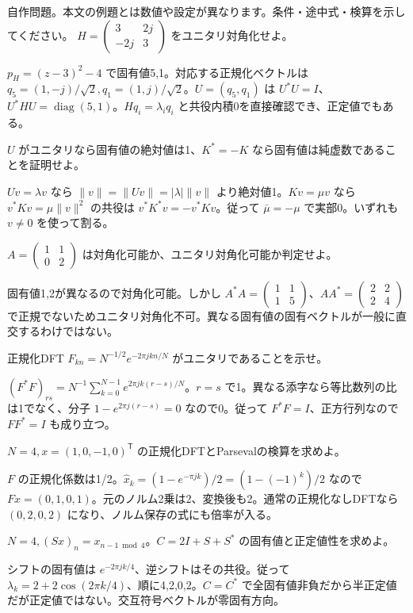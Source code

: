 \documentclass[11pt]{article}
\begin{document}
自作問題。本文の例題とは数値や設定が異なります。条件・途中式・検算を示してください。
\problem[Hermite対角化]
$H=\begin{pmatrix}3&2j\\-2j&3\end{pmatrix}$ をユニタリ対角化せよ。
\begin{ans}
$p_H=(z-3)^2-4$ で固有値5,1。対応する正規化ベクトルは $q_5=(1,-j)/\sqrt2,q_1=(1,j)/\sqrt2$。$U=(q_5,q_1)$ は $U^*U=I$、$U^*HU=\operatorname{diag}(5,1)$。$Hq_i=\lambda_iq_i$ と共役内積0を直接確認でき、正定値でもある。
\end{ans}
\problem[ユニタリの固有値]
$U$ がユニタリなら固有値の絶対値は1、$K^*=-K$ なら固有値は純虚数であることを証明せよ。
\begin{ans}
$Uv=\lambda v$ なら $\|v\|=\|Uv\|=|\lambda|\|v\|$ より絶対値1。$Kv=\mu v$ なら $v^*Kv=\mu\|v\|^2$ の共役は $v^*K^*v=-v^*Kv$。従って $\bar\mu=-\mu$ で実部0。いずれも $v\ne0$ を使って割る。
\end{ans}
\newpage
\problem[正規性]
$A=\begin{pmatrix}1&1\\0&2\end{pmatrix}$ は対角化可能か、ユニタリ対角化可能か判定せよ。
\begin{ans}
固有値1,2が異なるので対角化可能。しかし $A^*A=\begin{pmatrix}1&1\\1&5\end{pmatrix}$、$AA^*=\begin{pmatrix}2&2\\2&4\end{pmatrix}$ で正規でないためユニタリ対角化不可。異なる固有値の固有ベクトルが一般に直交するわけではない。
\end{ans}
\problem[DFTの直交性]
正規化DFT $F_{kn}=N^{-1/2}e^{-2\pi jkn/N}$ がユニタリであることを示せ。
\begin{ans}
$(F^*F)_{rs}=N^{-1}\sum_{k=0}^{N-1}e^{2\pi jk(r-s)/N}$。$r=s$ で1。異なる添字なら等比数列の比は1でなく、分子 $1-e^{2\pi j(r-s)}=0$ なので0。従って $F^*F=I$、正方行列なので $FF^*=I$ も成り立つ。
\end{ans}
\newpage
\problem[4点DFT]
$N=4,x=(1,0,-1,0)^{\mathsf T}$ の正規化DFTとParsevalの検算を求めよ。
\begin{ans}
$F$ の正規化係数は1/2。$\widehat x_k=(1-e^{-\pi jk})/2=(1-(-1)^k)/2$ なので $Fx=(0,1,0,1)$。元のノルム2乗は2、変換後も2。通常の正規化なしDFTなら $(0,2,0,2)$ になり、ノルム保存の式にも倍率が入る。
\end{ans}
\problem[巡回行列]
$N=4,(Sx)_n=x_{n-1\bmod4}$。$C=2I+S+S^*$ の固有値と正定値性を求めよ。
\begin{ans}
シフトの固有値は $e^{-2\pi jk/4}$、逆シフトはその共役。従って $\lambda_k=2+2\cos(2\pi k/4)$、順に4,2,0,2。$C=C^*$ で全固有値非負だから半正定値だが正定値ではない。交互符号ベクトルが零固有方向。
\end{ans}
\end{document}
